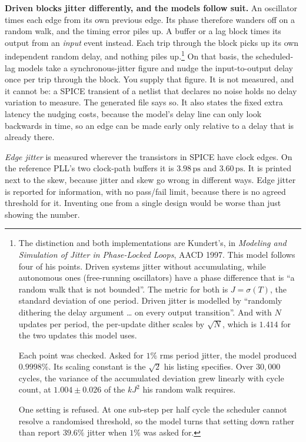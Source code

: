 \documentclass[11pt,a4paper]{article}
\newcommand{\unit}[1]{\,\textrm{#1}}
\begin{document}
\begin{itemize}[leftmargin=1.5em,itemsep=0.3em]
        \textbf{Driven blocks jitter differently, and the models follow
        suit.} An oscillator times each edge from its own previous
        edge. Its phase therefore wanders off on a random walk, and the
        timing error piles up. A buffer or a lag block times its output
        from an \emph{input} event instead. Each trip through the block
        picks up its own independent random delay, and nothing piles
        up.\footnote{%
        The distinction and both implementations are Kundert's, in
        \emph{Modeling and Simulation of Jitter in Phase-Locked Loops},
        AACD 1997. This model follows four of his points. Driven
        systems jitter without accumulating, while autonomous ones
        (free-running oscillators) have a phase difference that is ``a
        random walk that is not bounded''. The metric for both is
        $J = \sigma(T)$, the standard deviation of one period. Driven
        jitter is modelled by ``randomly dithering the delay argument
        \ldots{} on every output transition''. And with $N$ updates per
        period, the per-update dither scales by $\sqrt{N}$, which is
        $1.414$ for the two updates this model uses.

        Each point was checked. Asked for $1\%$ rms period jitter, the
        model produced $0.9998\%$. Its scaling constant is the
        $\sqrt{2}$ his listing specifies. Over $30{,}000$ cycles, the
        variance of the accumulated deviation grew linearly with cycle
        count, at $1.004 \pm 0.026$ of the $k J^2$ his random walk
        requires.

        One setting is refused. At one sub-step per half cycle the
        scheduler cannot resolve a randomised threshold, so the model
        turns that setting down rather than report $39.6\%$ jitter when
        $1\%$ was asked for.} On that basis, the scheduled-lag models
        take a synchronous-jitter figure and nudge the input-to-output
        delay once per trip through the block. You supply that figure.
        It is not measured, and it cannot be: a SPICE transient of a
        netlist that declares no noise holds no delay variation to
        measure. The generated file says so. It also states the fixed
        extra latency the nudging costs, because the model's delay line
        can only look backwards in time, so an edge can be made early
        only relative to a delay that is already there.

        \emph{Edge jitter} is measured wherever the transistors in
        SPICE have clock edges. On the reference PLL's two clock-path
        buffers it is $3.98\unit{ps}$ and $3.60\unit{ps}$. It is
        printed next to the skew, because jitter and skew go wrong in
        different ways. Edge jitter is reported for information, with
        no pass/fail limit, because there is no agreed threshold for
        it. Inventing one from a single design would be worse than just
        showing the number.


\end{itemize}
\end{document}

